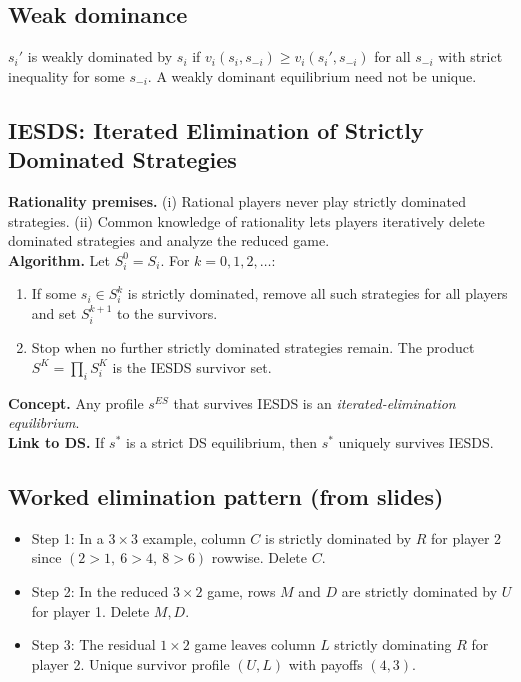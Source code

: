 \documentclass[10pt]{article}
\begin{document}
\subsection*{Weak dominance}
$s_i'$ is weakly dominated by $s_i$ if $v_i(s_i,s_{-i})\ge v_i(s_i',s_{-i})$ for all $s_{-i}$ with strict inequality for some $s_{-i}$. A weakly dominant equilibrium need not be unique.

\subsection*{IESDS: Iterated Elimination of Strictly Dominated Strategies}
\textbf{Rationality premises.} (i) Rational players never play strictly dominated strategies. (ii) Common knowledge of rationality lets players iteratively delete dominated strategies and analyze the reduced game.\\[2pt]
\textbf{Algorithm.} Let $S_i^0=S_i$. For $k=0,1,2,\dots$:
\begin{enumerate}[label=\arabic*)]
\item If some $s_i\in S_i^k$ is strictly dominated, remove all such strategies for all players and set $S_i^{k+1}$ to the survivors.
\item Stop when no further strictly dominated strategies remain. The product $S^K=\prod_i S_i^K$ is the IESDS survivor set.
\end{enumerate}
\textbf{Concept.} Any profile $s^{ES}$ that survives IESDS is an \emph{iterated-elimination equilibrium}.\\
\textbf{Link to DS.} If $s^*$ is a strict DS equilibrium, then $s^*$ uniquely survives IESDS.

\subsection*{Worked elimination pattern (from slides)}
\begin{itemize}
\item Step 1: In a $3\times3$ example, column $C$ is strictly dominated by $R$ for player 2 since $(2>1,\ 6>4,\ 8>6)$ rowwise. Delete $C$.
\item Step 2: In the reduced $3\times2$ game, rows $M$ and $D$ are strictly dominated by $U$ for player 1. Delete $M,D$.
\item Step 3: The residual $1\times2$ game leaves column $L$ strictly dominating $R$ for player 2. Unique survivor profile $(U,L)$ with payoffs $(4,3)$.
\end{itemize}
\end{document}
